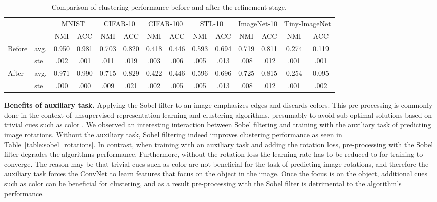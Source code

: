 \documentclass[a4paper,conference]{IEEEtran}
\begin{document}
\begin{table*}[t]
\begin{center}
\small
\caption{\protect\justify Comparison of clustering performance before and after the refinement stage.}
\label{table:refine}
\begin{tabular}{l l c c c c c c c c c c c c}
\toprule
 & & \multicolumn{2}{c}{MNIST} & \multicolumn{2}{c}{CIFAR-10} & \multicolumn{2}{c}{CIFAR-100} & \multicolumn{2}{c}{STL-10}  & \multicolumn{2}{c}{ImageNet-10} & \multicolumn{2}{c}{Tiny-ImageNet} \\
& & NMI & ACC & NMI & ACC & NMI & ACC & NMI & ACC & NMI & ACC & NMI & ACC \\
\midrule
\multirow{ 2}{*}{Before} & avg. & 0.950 & 0.981 & 0.703 & 0.820 & 0.418 & 0.446 & 0.593 & 0.694 & 0.719 & 0.811 & 0.274 & 0.119 \\
& ste & .002 & .001 & .011 & .019 & .003 & .006 & .005 & .013 & .008 & .012 & .001 & .001 \\
\midrule
\multirow{ 2}{*}{After} & avg. & 0.971 & 0.990 & 0.715 & 0.829 & 0.422 & 0.446 & 0.596 & 0.696 & 0.725 & 0.815 & 0.254 & 0.095 \\
& ste & .000 & .000 & .009 & .021 & .002 & .005 & .005 & .013 & .008 & .012 & .001 & .002 \\
\bottomrule
\end{tabular}
\end{center}
\end{table*}




\textbf{Benefits of auxiliary task.}
Applying the Sobel filter to an image emphasizes edges and discards colors. This pre-processing is commonly done in the context of unsupervised representation learning and clustering algorithms, presumably to avoid sub-optimal solutions based on trivial cues such as color \cite{BJ2017, iic}. We observed an interesting interaction between Sobel filtering and training with the auxiliary task of predicting image rotations. Without the auxiliary task, Sobel filtering indeed improves clustering performance as seen in Table~\ref{table:sobel_rotations}. In contrast, when training with an auxiliary task and adding the rotation loss, pre-processing with the Sobel filter degrades the algorithms performance. Furthermore, without the rotation loss the learning rate has to be reduced to  for training to converge. The reason may be that trivial cues such as color are not beneficial for the task of predicting image rotations, and therefore the auxiliary task forces the ConvNet to learn features that focus on the object in the image. Once the focus is on the object, additional cues such as color can be beneficial for clustering, and as a result pre-processing with the Sobel filter is detrimental to the algorithm's performance.
\end{document}
